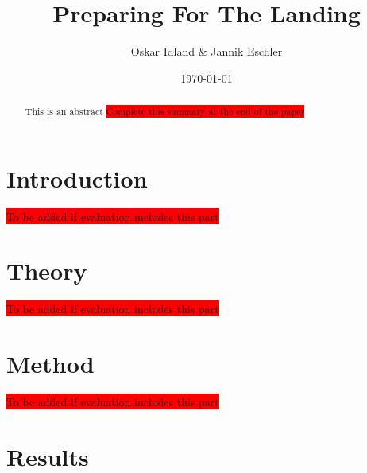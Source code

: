 \documentclass[reprint,english,notitlepage]{revtex4-2}
\begin{document}
\title{Preparing For The Landing}
\author{Oskar Idland \& Jannik Eschler}
\date{\today}

\begin{abstract}
    This is an abstract \colorbox{red}{Complete this summary at the end of the paper}
\end{abstract}
\maketitle
\section{Introduction} \label{sec:introduction}
\colorbox{red}{To be added if evaluation includes this part}
\section{Theory} \label{sec: theory}
\colorbox{red}{To be added if evaluation includes this part}
\section{Method} \label{sec: method}
\colorbox{red}{To be added if evaluation includes this part}
\section{Results} \label{sec: results}
\onecolumngrid
\end{document}
